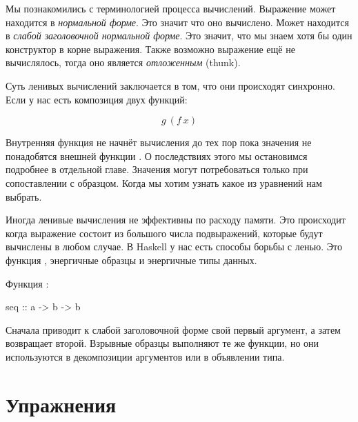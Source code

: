 Мы познакомились с терминологией процесса вычислений. Выражение может
находится в \emph{нормальной форме}. Это значит что оно вычислено. Может
находится в \emph{слабой заголовочной нормальной форме}. Это значит, что
мы знаем хотя бы один конструктор в корне выражения. Также возможно
выражение ещё не вычислялось, тогда оно является \emph{отложенным}
(thunk).

Суть ленивых вычислений заключается в том, что они происходят синхронно.
Если у нас есть композиция двух функций:

\[g\ (f\ x)\]

Внутренняя функция  не начнёт вычисления до тех пор пока значения
не понадобятся внешней функции . О последствиях этого мы
остановимся подробнее в отдельной главе. Значения могут потребоваться
только при сопоставлении с образцом. Когда мы хотим узнать какое из
уравнений нам выбрать.

Иногда ленивые вычисления не эффективны по расходу памяти. Это
происходит когда выражение состоит из большого числа подвыражений,
которые будут вычислены в любом случае. В Haskell у нас есть способы
борьбы с ленью. Это функция , энергичные образцы и энергичные
типы данных.

Функция :


\begin{code}
seq :: a -> b -> b
\end{code}

Сначала приводит к слабой заголовочной форме свой первый аргумент, а
затем возвращает второй. Взрывные образцы выполняют те же функции, но
они используются в декомпозиции аргументов или в объявлении типа.

\section{Упражнения}

